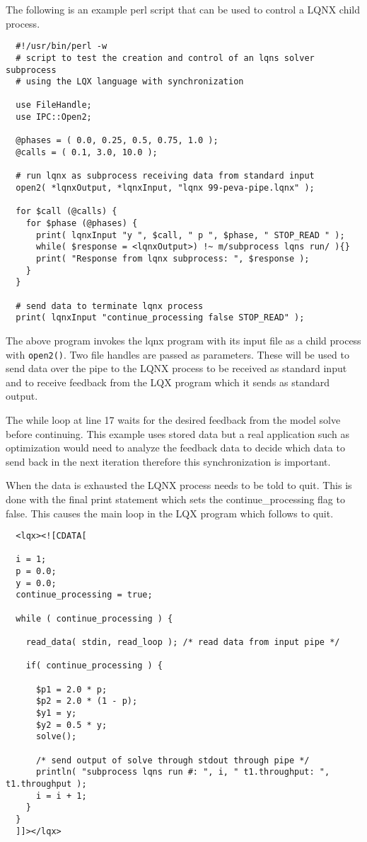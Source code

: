 The following is an example perl script that can be used to control a LQNX child process.

\lstset{language=Perl}
\begin{lstlisting}  
  #!/usr/bin/perl -w
  # script to test the creation and control of an lqns solver subprocess 
  # using the LQX language with synchronization

  use FileHandle;
  use IPC::Open2;

  @phases = ( 0.0, 0.25, 0.5, 0.75, 1.0 );
  @calls = ( 0.1, 3.0, 10.0 );

  # run lqnx as subprocess receiving data from standard input
  open2( *lqnxOutput, *lqnxInput, "lqnx 99-peva-pipe.lqnx" );

  for $call (@calls) {
    for $phase (@phases) {
      print( lqnxInput "y ", $call, " p ", $phase, " STOP_READ " );
      while( $response = <lqnxOutput>) !~ m/subprocess lqns run/ ){}
      print( "Response from lqnx subprocess: ", $response );
    }
  }

  # send data to terminate lqnx process
  print( lqnxInput "continue_processing false STOP_READ" );
\end{lstlisting}


The above program invokes the lqnx program with its input file as a child process with {\tt open2()}. Two file
handles are passed as parameters. These will be used to send data over the pipe to the LQNX process to be
received as standard input and to receive feedback from the LQX program which it sends as standard output.

The while loop at line 17 waits for the desired feedback from the model solve before continuing. This example
uses stored data but a real application such as optimization would need to analyze the feedback data to decide
which data to send back in the next iteration therefore this synchronization is important.

When the data is exhausted the LQNX process needs to be told to quit. This is done with the final print statement
which sets the continue\_processing flag to false. This causes the main loop in the LQX program which follows to
quit.

\lstset{language=C++}
\begin{lstlisting}
  <lqx><![CDATA[

  i = 1;
  p = 0.0;
  y = 0.0;
  continue_processing = true;

  while ( continue_processing ) {

    read_data( stdin, read_loop ); /* read data from input pipe */

    if( continue_processing ) {

      $p1 = 2.0 * p;
      $p2 = 2.0 * (1 - p);
      $y1 = y;
      $y2 = 0.5 * y;
      solve();

      /* send output of solve through stdout through pipe */
      println( "subprocess lqns run #: ", i, " t1.throughput: ", t1.throughput );
      i = i + 1;
    }
  }
  ]]></lqx>

\end{lstlisting}

